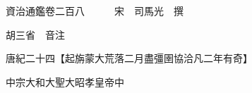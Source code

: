 










 


 
 


 

  
  
  
  
  





  
  
  
  
  
 
  

  

  
  
  



  

 
 

  
   




  

  
  


  　　資治通鑑卷二百八　　　宋　司馬光　撰

　　胡三省　音注

　　唐紀二十四【起旃蒙大荒落二月盡彊圉協洽凡二年有奇】

　　中宗大和大聖大昭孝皇帝中

